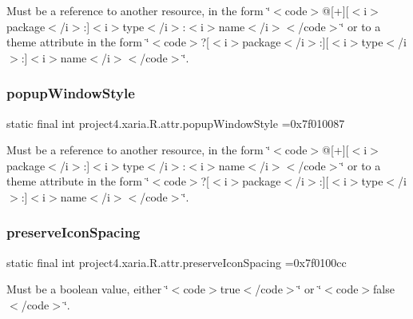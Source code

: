 Must be a reference to another resource, in the form \char`\"{}$<$code$>$@\mbox{[}+\mbox{]}\mbox{[}$<$i$>$package$<$/i$>$\+:\mbox{]}$<$i$>$type$<$/i$>$\+:$<$i$>$name$<$/i$>$$<$/code$>$\char`\"{} or to a theme attribute in the form \char`\"{}$<$code$>$?\mbox{[}$<$i$>$package$<$/i$>$\+:\mbox{]}\mbox{[}$<$i$>$type$<$/i$>$\+:\mbox{]}$<$i$>$name$<$/i$>$$<$/code$>$\char`\"{}. \mbox{\label{classproject4_1_1xaria_1_1R_1_1attr_a4fe6f821e3a9aba22e4cb5278fb94510}} 
\subsubsection{\texorpdfstring{popup\+Window\+Style}{popupWindowStyle}}
{\footnotesize\ttfamily static final int project4.\+xaria.\+R.\+attr.\+popup\+Window\+Style =0x7f010087\hspace{0.3cm}{\ttfamily [static]}}

Must be a reference to another resource, in the form \char`\"{}$<$code$>$@\mbox{[}+\mbox{]}\mbox{[}$<$i$>$package$<$/i$>$\+:\mbox{]}$<$i$>$type$<$/i$>$\+:$<$i$>$name$<$/i$>$$<$/code$>$\char`\"{} or to a theme attribute in the form \char`\"{}$<$code$>$?\mbox{[}$<$i$>$package$<$/i$>$\+:\mbox{]}\mbox{[}$<$i$>$type$<$/i$>$\+:\mbox{]}$<$i$>$name$<$/i$>$$<$/code$>$\char`\"{}. \mbox{\label{classproject4_1_1xaria_1_1R_1_1attr_a06451c64c4676512519c046c6f5e065b}} 
\subsubsection{\texorpdfstring{preserve\+Icon\+Spacing}{preserveIconSpacing}}
{\footnotesize\ttfamily static final int project4.\+xaria.\+R.\+attr.\+preserve\+Icon\+Spacing =0x7f0100cc\hspace{0.3cm}{\ttfamily [static]}}

Must be a boolean value, either \char`\"{}$<$code$>$true$<$/code$>$\char`\"{} or \char`\"{}$<$code$>$false$<$/code$>$\char`\"{}. 

